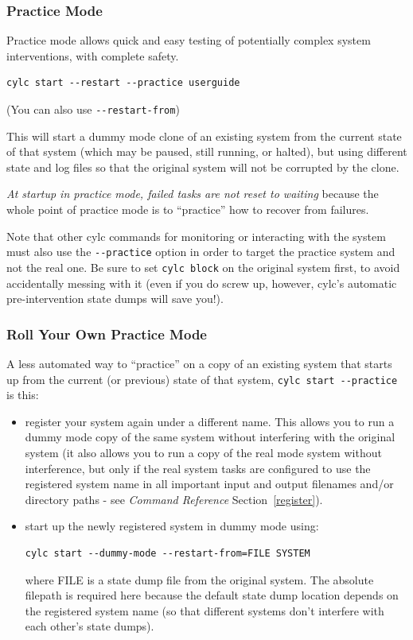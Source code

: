 \documentclass[11pt,a4paper]{article}
\begin{document}
\subsubsection{Practice Mode}

Practice mode allows quick and easy testing of potentially complex
system interventions, with complete safety.

\begin{lstlisting}
cylc start --restart --practice userguide
\end{lstlisting}
(You can also use \lstinline=--restart-from=)

This will start a dummy mode clone of an existing system from the
current state of that system (which may be paused, still running, or
halted), but using different state and log files so that the original
system will not be corrupted by the clone.

{\em At startup in practice mode, failed tasks are not reset to waiting}
because the whole point of practice mode is to ``practice'' how to
recover from failures.

Note that other cylc commands for monitoring or interacting with the
system must also use the \lstinline=--practice= option in order to
target the practice system and not the real one. Be sure to set
\lstinline=cylc block= on the original system first, to avoid
accidentally messing with it (even if you do screw up, however, cylc's
automatic pre-intervention state dumps will save you!).


\subsubsection{Roll Your Own Practice Mode}

A less automated way to ``practice'' on a copy of an existing system
that starts up from the current (or previous) state of that system, 
\lstinline=cylc start --practice= is this:

\begin{itemize}
    \item register your system again under a different name. This allows
        you to run a dummy mode copy of the same system without
        interfering with the original system (it also allows you to run
        a copy of the real mode system without interference, but only if
        the real system tasks are configured to use the registered
        system name in all important input and output filenames and/or
        directory paths - see {\em Command Reference} Section~\ref{register}).

    \item start up the newly registered system in dummy mode using:
        \begin{lstlisting}
cylc start --dummy-mode --restart-from=FILE SYSTEM
        \end{lstlisting}
        where FILE is a state dump file from the original system. The
        absolute filepath is required here because the default state
        dump location depends on the registered system name (so that
        different systems don't interfere with each other's state
        dumps).

\end{itemize}
\end{document}
